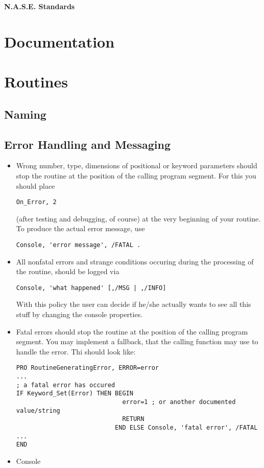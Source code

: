 \documentclass[12pt]{article}
\begin{document}
{\Huge\textbf{N.A.S.E. Standards}}

\section{Documentation}

\section{Routines}
\subsection{Naming}
\subsection{Error Handling and Messaging}
\begin{itemize}
%
\item Wrong number, type, dimensions of positional or keyword parameters should stop the routine at the position of the calling program segment. For this you should place 
\begin{verbatim}
On_Error, 2
\end{verbatim}
(after testing and debugging, of course) at the very beginning of your routine. To produce the actual error message, use
\begin{verbatim}
Console, 'error message', /FATAL .
\end{verbatim}
%
\item All nonfatal errors and strange conditions occuring during the processing of the routine, should be logged via
\begin{verbatim}
Console, 'what happened' [,/MSG | ,/INFO] 
\end{verbatim}
With this policy the user can decide if he/she actually wants to see all this stuff by changing the console properties.
%
\item Fatal errors should stop the routine at the position of the calling program segment. You may implement a fallback, that the calling function may use to handle the error. Thi should look like:
\begin{verbatim}
PRO RoutineGeneratingError, ERROR=error
...
; a fatal error has occured
IF Keyword_Set(Error) THEN BEGIN
                             error=1 ; or another documented value/string
                             RETURN
                           END ELSE Console, 'fatal error', /FATAL
...
END
\end{verbatim}
%
\item Console
%
\end{itemize}
\end{document}
